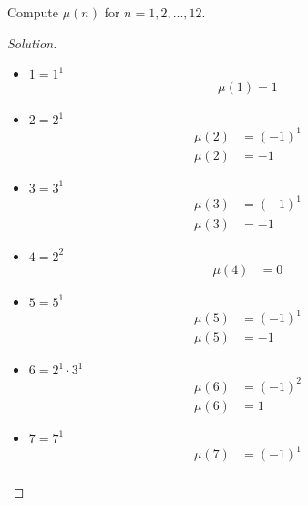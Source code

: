 \documentclass[11pt]{article}
\newenvironment{myproblem}[1][Problem]{\begin{trivlist}
    \item[\hskip \labelsep {\bfseries #1.}]}{\end{trivlist}}
\newenvironment{solution}
  {\renewcommand\qedsymbol{$~$}\begin{proof}[Solution]$ $\par\nobreak\ignorespaces}
  {\end{proof}}
\begin{document}
\section{}

\begin{myproblem}
    Compute $\mu(n)$ for $n=1,2,..., 12$.
\end{myproblem}

\begin{solution}
    \begin{itemize}
        \item[\textbf{1:}]
              $1=1^1$
              \begin{align*}
                  \mu(1) = 1
              \end{align*}
        \item[\textbf{2:}]
              $2=2^1$
              \begin{align*}
                  \mu(2) & = (-1)^1 \\
                  \mu(2) & = -1
              \end{align*}
        \item[\textbf{3:}]
              $3=3^1$
              \begin{align*}
                  \mu(3) & = (-1)^1 \\
                  \mu(3) & = -1
              \end{align*}
        \item[\textbf{4:}]
              $4=2^2$
              \begin{align*}
                  \mu(4) & = 0
              \end{align*}
        \item[\textbf{5:}]
              $5=5^1$
              \begin{align*}
                  \mu(5) & = (-1)^1 \\
                  \mu(5) & = -1
              \end{align*}
        \item[\textbf{6:}]
              $6=2^1 \cdot 3^1$
              \begin{align*}
                  \mu(6) & = (-1)^2 \\
                  \mu(6) & = 1
              \end{align*}
        \item[\textbf{7:}]
              $7 = 7^1$
              \begin{align*}
                  \mu(7) & = (-1)^1 \\

\end{align*}
\end{itemize}
\end{solution}
\end{document}
